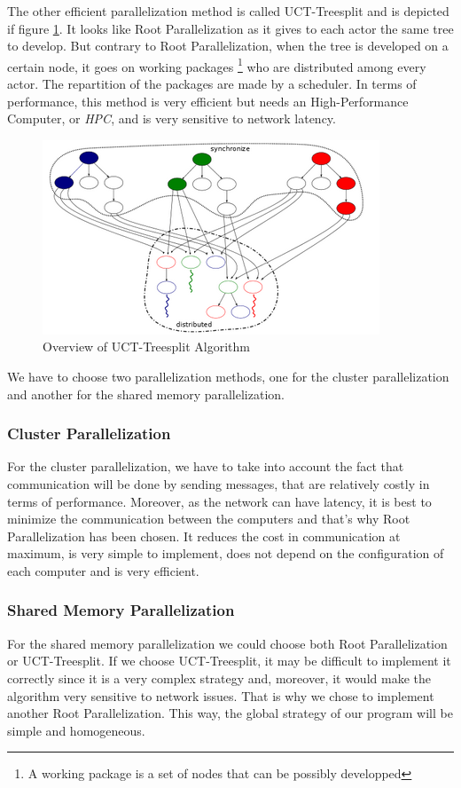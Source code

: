 The other efficient parallelization method is called UCT-Treesplit and is depicted if figure \ref{fig:treesplit}. It looks like Root Parallelization as it gives to each actor the same tree to develop.
But contrary to Root Parallelization, when the tree is developed on a certain node, it goes on working packages \footnote{A working package is a set of nodes that can be possibly developped} who are distributed among every actor. The repartition of the packages are made by a scheduler.
In terms of performance, this method is very efficient but needs an High-Performance Computer, or \emph{HPC}, and is very sensitive to network latency.

\begin{figure}[!ht] 
\centerline{\includegraphics[scale=0.80]{3Methods/3.1Parallelization_Method/treesplit.png}}
   \caption{Overview of UCT-Treesplit Algorithm}
\label{fig:treesplit}
\end{figure}


We have to choose two parallelization methods, one for the cluster parallelization and another for the shared memory parallelization.
\subsubsection{Cluster Parallelization}
For the cluster parallelization, we have to take into account the fact that communication will be done by sending messages, that are relatively costly in terms of performance.
Moreover, as the network can have latency, it is best to minimize the communication between the computers and that's why Root Parallelization has been chosen.
It reduces the cost in communication at maximum, is very simple to implement, does not depend on the configuration of each computer and is very efficient.
\subsubsection{Shared Memory Parallelization}
For the shared memory parallelization we could choose both Root Parallelization or UCT-Treesplit.
If we choose UCT-Treesplit, it may be difficult to implement it correctly since it is a very complex strategy and, moreover, it would make the algorithm very sensitive to network issues. That is why we chose to implement another Root Parallelization. This way, the global strategy of our program will be simple and homogeneous.
